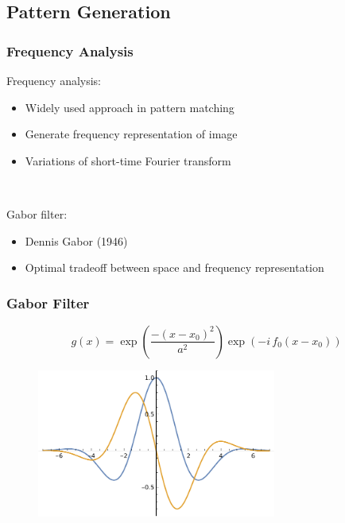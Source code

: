 \documentclass{beamer}
\begin{document}
\subsection{Pattern Generation}
\begin{frame}
    [fragile] \frametitle{Frequency Analysis}
    Frequency analysis:
    \begin{itemize}
        \item Widely used approach in pattern matching
        \item Generate frequency representation of image
        \item Variations of short-time Fourier transform
    \end{itemize}

\

    Gabor filter:
    \begin{itemize}
        \item Dennis Gabor (1946)
        \item Optimal tradeoff between space and frequency representation
    \end{itemize}
\end{frame}

\begin{frame}
    [fragile] \frametitle{Gabor Filter}
    \[
        g(x) = \exp\left( \frac{-(x-x_0)^2}{a^2}\right)\exp{(-i\,f_0(x-x_0))}
    \]
    \begin{figure}
        [t] \centering
        \includegraphics[width=0.7\textwidth]{gabor/gabor.pdf} \label{fig:gabor}
    \end{figure}
\end{frame}
\end{document}
